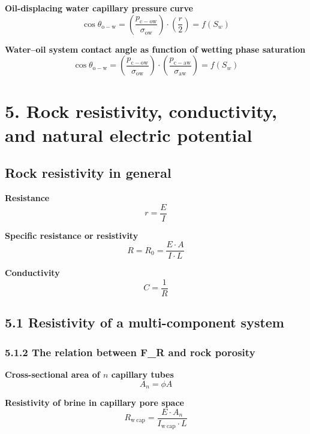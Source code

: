 \textbf{Oil-displacing water capillary pressure curve}
\begin{equation*}
    \cos\theta_\mathrm{o-w} = \left( \frac{p_\mathrm{c-ow}}{\sigma_\mathrm{ow}} \right)\cdot\left( \frac{r}{2} \right) = f(S_w)\tag{4.41}
\end{equation*}

\textbf{Water--oil system contact angle as function of wetting phase saturation}
\begin{equation*}
    \cos\theta_\mathrm{o-w} = \left( \frac{p_\mathrm{c-ow}}{\sigma_\mathrm{ow}} \right)\cdot\left( \frac{p_\mathrm{c-aw}}{\sigma_\mathrm{aw}} \right) = f(S_w)\tag{4.42}
\end{equation*}

\section{5. Rock resistivity, conductivity, and natural electric potential}
\subsection{Rock resistivity in general}
\textbf{Resistance}
\begin{equation*}
    r = \frac{E}{I}\tag{5.1}
\end{equation*}

\textbf{Specific resistance or resistivity}
\begin{equation*}
    R = R_0 = \frac{E\cdot A}{I\cdot L}\tag{5.2}
\end{equation*}

\textbf{Conductivity}
\begin{equation*}
    C = \frac{1}{R}\tag{5.3}
\end{equation*}

\subsection{5.1 Resistivity of a multi-component system}
\subsubsection{5.1.2 The relation between F\_R and rock porosity}
\textbf{Cross-sectional area of $n$ capillary tubes}
\begin{equation*}
    A_n = \phi A\tag{5.4}
\end{equation*}

\textbf{Resistivity of brine in capillary pore space}
\begin{equation*}
    R_\mathrm{w\ cap} = \frac{E\cdot A_n}{I_\mathrm{w\ cap}\cdot L}\tag{5.5}
\end{equation*}

